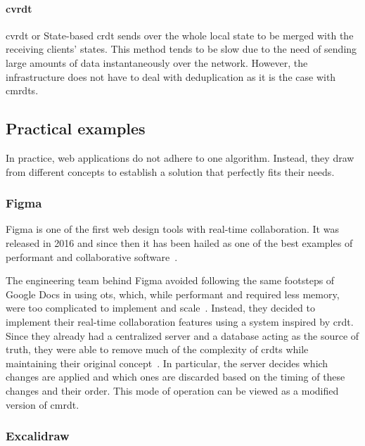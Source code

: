 \begin{toexclude}
\paragraph{\acrshort{cvrdt}}

\acrlong{cvrdt} or State-based \acrshort{crdt} sends over the whole local state to be merged with the receiving clients' states. This method tends to be slow due to the need of sending large amounts of data instantaneously over the network. However, the infrastructure does not have to deal with deduplication as it is the case with \acrshort{cmrdt}s.

\subsection{Practical examples}

In practice, web applications do not adhere to one algorithm.
Instead, they draw from different concepts to establish a solution that perfectly fits their needs.

\subsubsection{Figma}


Figma is one of the first web design tools with real-time collaboration.
It was released in 2016 and since then it has been hailed as one of the best examples of performant and collaborative software~\autocite{tools_2020_nodate}.

The engineering team behind Figma avoided following the same footsteps of Google Docs in using \acrshort{ot}s, which, while performant and required less memory, were too complicated to implement and scale~\autocite{wallace_how_nodate}.
Instead, they decided to implement their real-time collaboration features using a system inspired by \acrshort{crdt}.
Since they already had a centralized server and a database acting as the source of truth, they were able to remove much of the complexity of \acrshort{crdt}s while maintaining their original concept~\autocite{wallace_how_nodate}.
In particular, the server decides which changes are applied and which ones are discarded based on the timing of these changes and their order.
This mode of operation can be viewed as a modified version of \acrshort{cmrdt}.


\subsubsection{Excalidraw}


\end{toexclude}
